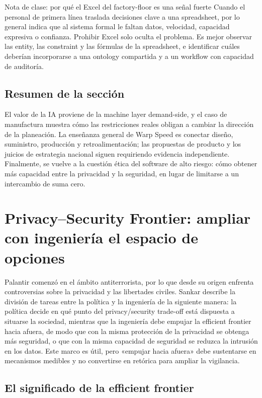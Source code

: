 \documentclass[a4paper]{article}
\begin{document}
\begin{knowledgebox}{Nota de clase: por qué el Excel del factory-floor es una señal fuerte}
Cuando el personal de primera línea traslada decisiones clave a una spreadsheet, por lo general indica que al sistema formal le faltan datos, velocidad, capacidad expresiva o confianza. Prohibir Excel solo oculta el problema. Es mejor observar las entity, las constraint y las fórmulas de la spreadsheet, e identificar cuáles deberían incorporarse a una ontology compartida y a un workflow con capacidad de auditoría.
\end{knowledgebox}

\subsection{Resumen de la sección}

El valor de la IA proviene de la machine layer demand-side, y el caso de manufactura muestra cómo las restricciones reales obligan a cambiar la dirección de la planeación. La enseñanza general de Warp Speed es conectar diseño, suministro, producción y retroalimentación; las propuestas de producto y los juicios de estrategia nacional siguen requiriendo evidencia independiente. Finalmente, se vuelve a la cuestión ética del software de alto riesgo: cómo obtener más capacidad entre la privacidad y la seguridad, en lugar de limitarse a un intercambio de suma cero.
\section{Privacy–Security Frontier: ampliar con ingeniería el espacio de opciones}

Palantir comenzó en el ámbito antiterrorista, por lo que desde su origen enfrenta controversias sobre la privacidad y las libertades civiles. Sankar describe la división de tareas entre la política y la ingeniería de la siguiente manera: la política decide en qué punto del privacy/security trade-off está dispuesta a situarse la sociedad, mientras que la ingeniería debe empujar la efficient frontier hacia afuera, de modo que con la misma protección de la privacidad se obtenga más seguridad, o que con la misma capacidad de seguridad se reduzca la intrusión en los datos. Este marco es útil, pero «empujar hacia afuera» debe sustentarse en mecanismos medibles y no convertirse en retórica para ampliar la vigilancia.

\subsection{El significado de la efficient frontier}
\end{document}
